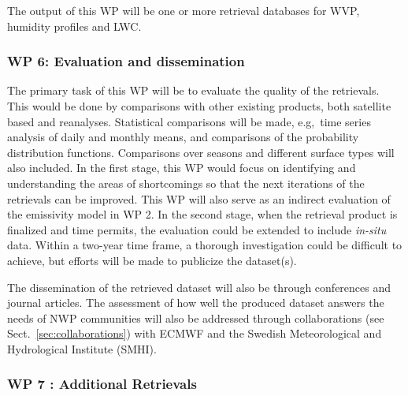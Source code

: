 \documentclass[12pt,oneside,a4paper]{article}
\begin{document}
The output of this WP will be one or more retrieval databases for WVP, humidity profiles and LWC.
\vspace{-1.0ex}
\subsubsection*{WP 6: Evaluation and dissemination}
%
\label{sec:evaluation}
The primary task of this WP will be to evaluate the quality of the retrievals.  This would be done by comparisons with other existing products, both satellite based and reanalyses. Statistical comparisons will be made, e.g,\, time series analysis of daily and monthly means, and comparisons of the probability
distribution functions. Comparisons over seasons and different surface types will also included. In the first stage, this WP would focus on identifying and understanding the areas of shortcomings so that the next iterations of the retrievals can be improved. This WP will also serve as an indirect evaluation of the emissivity model in WP 2. In the second stage, when the retrieval product is finalized and time permits, the evaluation could be extended to include \textit{in-situ} data. Within a two-year time frame, a thorough investigation could be difficult to achieve, but efforts will be made to publicize the dataset(s). 
 

The dissemination of the retrieved dataset will also be through conferences and journal articles. The assessment of how well the produced dataset answers the needs of NWP communities will also be addressed through collaborations (see Sect.~\ref{sec:collaborations}) with ECMWF and the Swedish Meteorological and Hydrological Institute (SMHI). 
\vspace{-1.0ex}
\subsubsection*{WP 7 : Additional Retrievals}
%
\label{sec:other_retrievals}
\end{document}
